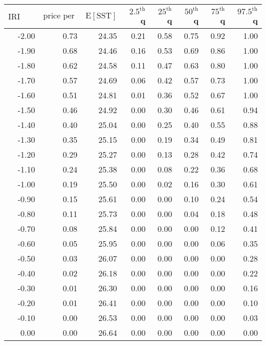 \begin{table*}[ht]
\centering \footnotesize
\begin{tabular}{rrrrrrrr}
  \hline
$\mbox{IRI anom}$ & $\mbox{price per USD}$ & $\mbox{E}[\mbox{SST}]$ & $2.5^{\mbox{th}}$ q & $25^{\mbox{th}}$ q & $50^{\mbox{th}}$ q & $75^{\mbox{th}}$ q & $97.5^{\mbox{th}}$ q \\ 
  \hline
-2.00 & 0.73 & 24.35 & 0.21 & 0.58 & 0.75 & 0.92 & 1.00 \\ 
  -1.90 & 0.68 & 24.46 & 0.16 & 0.53 & 0.69 & 0.86 & 1.00 \\ 
  -1.80 & 0.62 & 24.58 & 0.11 & 0.47 & 0.63 & 0.80 & 1.00 \\ 
  -1.70 & 0.57 & 24.69 & 0.06 & 0.42 & 0.57 & 0.73 & 1.00 \\ 
  -1.60 & 0.51 & 24.81 & 0.01 & 0.36 & 0.52 & 0.67 & 1.00 \\ 
  -1.50 & 0.46 & 24.92 & 0.00 & 0.30 & 0.46 & 0.61 & 0.94 \\ 
  -1.40 & 0.40 & 25.04 & 0.00 & 0.25 & 0.40 & 0.55 & 0.88 \\ 
  -1.30 & 0.35 & 25.15 & 0.00 & 0.19 & 0.34 & 0.49 & 0.81 \\ 
  -1.20 & 0.29 & 25.27 & 0.00 & 0.13 & 0.28 & 0.42 & 0.74 \\ 
  -1.10 & 0.24 & 25.38 & 0.00 & 0.08 & 0.22 & 0.36 & 0.68 \\ 
  -1.00 & 0.19 & 25.50 & 0.00 & 0.02 & 0.16 & 0.30 & 0.61 \\ 
  -0.90 & 0.15 & 25.61 & 0.00 & 0.00 & 0.10 & 0.24 & 0.54 \\ 
  -0.80 & 0.11 & 25.73 & 0.00 & 0.00 & 0.04 & 0.18 & 0.48 \\ 
  -0.70 & 0.08 & 25.84 & 0.00 & 0.00 & 0.00 & 0.12 & 0.41 \\ 
  -0.60 & 0.05 & 25.95 & 0.00 & 0.00 & 0.00 & 0.06 & 0.35 \\ 
  -0.50 & 0.03 & 26.07 & 0.00 & 0.00 & 0.00 & 0.00 & 0.28 \\ 
  -0.40 & 0.02 & 26.18 & 0.00 & 0.00 & 0.00 & 0.00 & 0.22 \\ 
  -0.30 & 0.01 & 26.30 & 0.00 & 0.00 & 0.00 & 0.00 & 0.16 \\ 
  -0.20 & 0.01 & 26.41 & 0.00 & 0.00 & 0.00 & 0.00 & 0.10 \\ 
  -0.10 & 0.00 & 26.53 & 0.00 & 0.00 & 0.00 & 0.00 & 0.03 \\ 
  0.00 & 0.00 & 26.64 & 0.00 & 0.00 & 0.00 & 0.00 & 0.00 \\ 

\end{tabular}
\end{table*}
